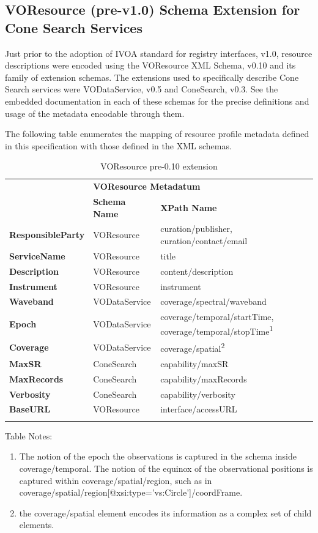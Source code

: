 \documentclass[11pt,a4paper]{ivoa}
\begin{document}
\subsection{VOResource (pre-v1.0) Schema Extension for Cone Search Services}
Just prior to the adoption of IVOA standard for registry interfaces, v1.0, resource descriptions were encoded using the VOResource XML Schema, v0.10 and its family of extension schemas. The extensions used to specifically describe Cone Search services were VODataService, v0.5 and ConeSearch, v0.3. See the embedded documentation in each of these schemas for the precise definitions and usage of the metadata encodable through them.

The following table enumerates the mapping of resource profile metadata defined in this specification with those defined in the XML schemas.

\begin{table}[th]
\begin{tabular}{p{}p{}p{}}
\sptablerule
\multirow{2}{*}{\textbf{Cone Search Metadatum}}&\multicolumn{2}{p{0.59\textwidth}}{\textbf{VOResource Metadatum}}\\
&\textbf{Schema Name}&\textbf{XPath Name}\\
\sptablerule
\textbf{ResponsibleParty} & VOResource & curation/publisher, curation/contact/email\\
\textbf{ServiceName} & VOResource & title\\
\textbf{Description} &	VOResource & content/description\\
\textbf{Instrument} & VOResource & instrument\\
\textbf{Waveband} & VODataService & coverage/spectral/waveband\\
\textbf{Epoch} & VODataService & coverage/temporal/startTime, coverage/temporal/stopTime\textsuperscript{1}\\
\textbf{Coverage} & VODataService & coverage/spatial\textsuperscript{2}\\
\textbf{MaxSR} & ConeSearch & capability/maxSR\\
\textbf{MaxRecords} & ConeSearch & capability/maxRecords\\
\textbf{Verbosity} & ConeSearch & capability/verbosity\\
\textbf{BaseURL} & VOResource & interface/accessURL\\
\sptablerule
\caption{VOResource pre-0.10 extension}
\label{table:extable}
\end{tabular}
\end{table}
Table Notes:
\begin{enumerate}
 \item The notion of the epoch the observations is captured in the schema inside coverage/temporal. The notion of the equinox of the observational positions is captured within coverage/spatial/region, such as in coverage/spatial/region[@xsi:type='vs:Circle']/coordFrame. 
 \item the coverage/spatial element encodes its information as a complex set of child elements.
\end{enumerate}
\end{document}
